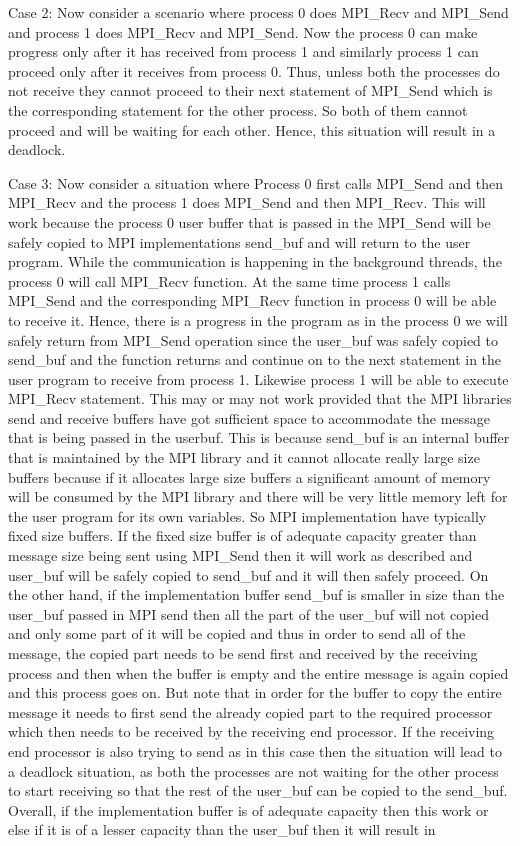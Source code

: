 \documentclass[12pt]{book}
\begin{document}
Case 2: Now consider a scenario where process 0 does MPI\_Recv and MPI\_Send and process 1 does MPI\_Recv and MPI\_Send. Now the process 0 can make progress only after it has received from process 1 and similarly process 1 can proceed only after it receives from process 0. Thus, unless both the processes do not receive they cannot proceed to their next statement of MPI\_Send which is the corresponding statement for the other process. So both of them cannot proceed and will be waiting for each other. Hence, this situation will result in a deadlock.

Case 3: Now consider a situation where Process 0 first calls MPI\_Send and then MPI\_Recv and the process 1 does MPI\_Send and then MPI\_Recv.
This will work because the process 0 user buffer that is passed in the MPI\_Send will be safely copied to MPI implementations send\_buf and will return to the user program. While the communication is happening in the background threads, the process 0 will call MPI\_Recv function. At the same time process 1 calls MPI\_Send and the corresponding MPI\_Recv function in process 0 will be able to receive it. Hence, there is a progress in the program as in the process 0 we will safely return from MPI\_Send operation since the user\_buf was safely copied to send\_buf and the function returns and continue on to the next statement in the user program to receive from process 1. Likewise process 1 will be able to execute MPI\_Recv statement. This may or may not work provided that the MPI libraries send and receive buffers have got sufficient space to accommodate the message that is being passed in the user\-buf. This is because send\_buf is an internal buffer that is maintained by the MPI library and it cannot allocate really large size buffers because if it allocates large size buffers a significant amount of memory will be consumed by the MPI library and there will be very little memory left for the user program for its own variables. So MPI implementation have typically fixed size buffers. If the fixed size buffer is of adequate capacity greater than message size being sent using MPI\_Send then it will work as described and user\_buf will be safely copied to send\_buf and it will then safely proceed. On the other hand, if the implementation buffer send\_buf is smaller in size than the user\_buf passed in MPI send then all the part of the user\_buf will not copied and only some part of it will be copied and thus in order to send all of the message, the copied part needs to be send first and received by the receiving process and then when the buffer is empty and the entire message is again copied and this process goes on. But note that in order for the buffer to copy the entire message it needs to first send the already copied part to the required processor which then needs to be received by the receiving end processor. If the receiving end processor is also trying to send as in this case then the situation will lead to a deadlock situation, as both the processes are not waiting for the other process to start receiving so that the rest of the user\_buf can be copied to the send\_buf. Overall, if the implementation buffer is of adequate capacity then this work or else if it is of a lesser capacity than the user\_buf then it will result in 
\end{document}
